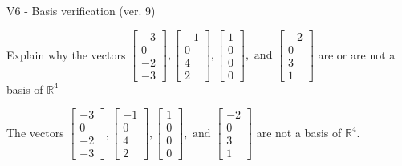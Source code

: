 \begin{exercise}
  \begin{exerciseTitle}V6 - Basis verification (ver. 9)\end{exerciseTitle}
  \begin{exerciseStatement}
    Explain why the vectors \(\left[\begin{array}{r}
-3 \\
0 \\
-2 \\
-3
\end{array}\right] , \left[\begin{array}{r}
-1 \\
0 \\
4 \\
2
\end{array}\right] , \left[\begin{array}{r}
1 \\
0 \\
0 \\
0
\end{array}\right] , \text{ and } \left[\begin{array}{r}
-2 \\
0 \\
3 \\
1
\end{array}\right]\) are or are not a basis of \(\mathbb{R}^4\)	


  \end{exerciseStatement}
  \begin{exerciseAnswer}
   The vectors \(\left[\begin{array}{r}
-3 \\
0 \\
-2 \\
-3
\end{array}\right] , \left[\begin{array}{r}
-1 \\
0 \\
4 \\
2
\end{array}\right] , \left[\begin{array}{r}
1 \\
0 \\
0 \\
0
\end{array}\right] , \text{ and } \left[\begin{array}{r}
-2 \\
0 \\
3 \\
1
\end{array}\right]\) 
  	 are not  a basis of \(\mathbb{R}^4\).
  


  \end{exerciseAnswer}
\end{exercise}